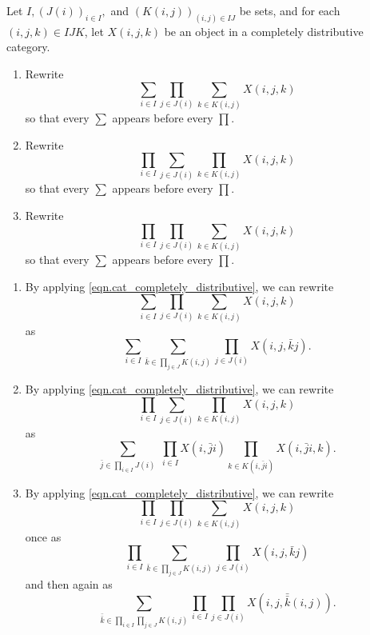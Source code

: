 \documentclass[Book-Poly]{subfiles}
\begin{document}
\begin{exercise} \label{exc.push_prod_sum_set}
    Let $I, (J(i))_{i\in I},$ and $(K(i,j))_{(i,j)\in IJ}$ be sets, and for each $(i,j,k)\in IJK$, let $X(i,j,k)$ be an object in a completely distributive category.
    \begin{enumerate}
        \item Rewrite
        \[
        \sum_{i\in I}\prod_{j\in J(i)}\sum_{k\in K(i,j)}X(i,j,k)
        \]
        so that every $\sum$ appears before every $\prod$.
        \item Rewrite
        \[
        \prod_{i\in I}\sum_{j\in J(i)}\prod_{k\in K(i,j)}X(i,j,k)
        \]
        so that every $\sum$ appears before every $\prod$.
        \item Rewrite
        \[
        \prod_{i\in I}\prod_{j\in J(i)}\sum_{k\in K(i,j)}X(i,j,k)
        \]
        so that every $\sum$ appears before every $\prod$.\qedhere
    \end{enumerate}
    \begin{solution}
        \begin{enumerate}
            \item By applying \eqref{eqn.cat_completely_distributive}, we can rewrite
            \[
            \sum_{i\in I}\prod_{j\in J(i)}\sum_{k\in K(i,j)}X(i,j,k)
            \]
            as
            \[
            \sum_{i\in I}\sum_{\bar{k}\in \prod_{j\in J}K(i,j)}\prod_{j\in J(i)}X(i,j,\bar{k}j).
            \]
            \item By applying \eqref{eqn.cat_completely_distributive}, we can rewrite
            \[
            \prod_{i\in I}\sum_{j\in J(i)}\prod_{k\in K(i,j)}X(i,j,k)
            \]
            as
            \[
            \sum_{\bar{j}\in \prod_{i\in I}J(i)}\;\prod_{i\in I}X(i,\bar{j}i)\prod_{k\in K(i,\bar{j}i)}X(i,\bar{j}i,k).
            \]
            \item By applying \eqref{eqn.cat_completely_distributive}, we can rewrite
            \[
            \prod_{i\in I}\prod_{j\in J(i)}\sum_{k\in K(i,j)}X(i,j,k)
            \]
            once as
            \[
            \prod_{i\in I}\sum_{\bar{k}\in\prod_{j\in J}K(i,j)}\prod_{j\in J(i)}X(i,j,\bar{k}j)
            \]
            and then again as
            \[
            \sum_{\bar{\bar{k}}\in\prod_{i\in I}\prod_{j\in J}K(i,j)}\prod_{i\in I}\prod_{j\in J(i)}X(i,j,\bar{\bar{k}}(i,j)).
            \]
        \end{enumerate}
    \end{solution}
\end{exercise}
\end{document}
